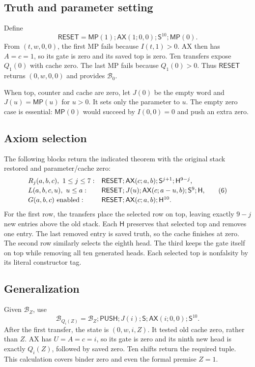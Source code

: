\documentclass[11pt]{article}
\newcommand{\AX}{\mathsf{AX}}
\newcommand{\MP}{\mathsf{MP}}
\newcommand{\SSS}{\mathsf S}
\newcommand{\ResetBlock}{\mathsf{RESET}}
\newcommand{\PushBlock}{\mathsf{PUSH}}
\newcommand{\PopBlock}{\mathsf H}
\begin{document}
\subsection{Truth and parameter setting}

Define
\[
 \ResetBlock=\MP(1);\AX(1;0,0);\SSS^{10};\MP(0).
\]
From $(t,w,0,0)$, the first MP fails because $I(t,1)>0$. AX then has $A=c=1$, so its gate is zero and its saved top is zero. Ten transfers expose $Q_1(0)$ with cache zero. The last MP fails because $Q_1(0)>0$. Thus $\ResetBlock$ returns $(0,w,0,0)$ and provides $\mathcal B_0$.

When top, counter and cache are zero, let $J(0)$ be the empty word and $J(u)=\MP(u)$ for $u>0$. It sets only the parameter to $u$. The empty zero case is essential: $\MP(0)$ would succeed by $I(0,0)=0$ and push an extra zero.

\subsection{Axiom selection}

The following blocks return the indicated theorem with the original stack restored and parameter/cache zero:
\[
\begin{array}{@{}ll@{}}
R_j(a,b,c),~1\le j\le7:
 &\ResetBlock;\AX(c;a,b);\SSS^{j+1};\PopBlock^{9-j},\\[2pt]
L(a,b,c,u),~u\le a:
 &\ResetBlock;J(u);\AX(c;a-u,b);\SSS^9;\PopBlock,\\[2pt]
G(a,b,c)\text{ enabled}:
 &\ResetBlock;\AX(c;a,b);\PopBlock^{10}.
\end{array}                                                     \tag{6}
\]
For the first row, the transfers place the selected row on top, leaving exactly $9-j$ new entries above the old stack. Each $\PopBlock$ preserves that selected top and removes one entry. The last removed entry is saved truth, so the cache finishes at zero. The second row similarly selects the eighth head. The third keeps the gate itself on top while removing all ten generated heads. Each selected top is nonfalsity by its literal constructor tag.

\subsection{Generalization}

Given $\mathcal B_Z$, use
\[
 \mathcal B_{Q_i(Z)}=
 \mathcal B_Z;\PushBlock;J(i);\SSS;\AX(i;0,0);\SSS^{10}.             \tag{7}
\]
After the first transfer, the state is $(0,w,i,Z)$. It tested old cache zero, rather than $Z$. AX has $U=A=c=i$, so its gate is zero and its ninth new head is exactly $Q_i(Z)$, followed by saved zero. Ten shifts return the required tuple. This calculation covers binder zero and even the formal premise $Z=1$.
\end{document}

